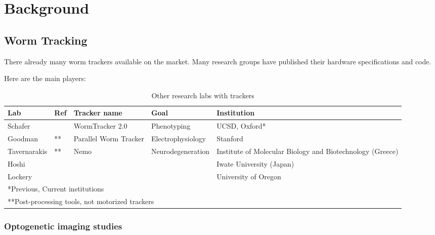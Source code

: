 \documentclass[main.tex]{subfiles}
\begin{document}
\section{Background}
 
\subsection{Worm Tracking}
There already many worm trackers available on the market. Many research groups have published their hardware specifications and code. 

Here are the main players:
\begin{table}[!htbp]
  \centering
  \begin{tabular}{l l l l p{5cm}}
\toprule
Lab          & Ref                   & Tracker name          & Goal              & Institution                                               \\
\midrule
Schafer      & \cite{yemini2013}     & WormTracker 2.0       & Phenotyping       & UCSD, Oxford*                                             \\
Goodman      & \cite{ramot2008}**    & Parallel Worm Tracker & Electrophysiology & Stanford                                                  \\
Tavernarakis & \cite{tsibidis2007}** & Nemo                  & Neurodegeneration & Institute of Molecular Biology and Biotechnology (Greece) \\
Hoshi        & \cite{hoshi2006}      &                       &                   & Iwate University (Japan)                                  \\
Lockery      & \cite{pierce1999}     &                       &                   & University of Oregon                                      \\
\midrule
\multicolumn{4}{l}{*Previous, Current institutions}                                                                                          \\
\multicolumn{4}{l}{**Post-processing tools, not motorized trackers}                                                                          \\
\bottomrule
  \end{tabular}
  \caption{Other research labs with trackers}
  \label{tab:juggernauts}
\end{table}

\subsubsection{Optogenetic imaging studies}
\end{document}
